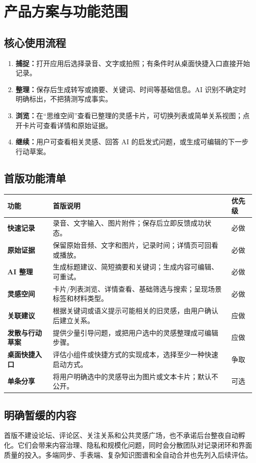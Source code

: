 \documentclass[UTF8,a4paper,12pt]{ctexart}
\begin{document}
\section{产品方案与功能范围}

\subsection{核心使用流程}
\begin{enumerate}
  \item \textbf{捕捉：}打开应用后选择录音、文字或拍照；有条件时从桌面快捷入口直接开始记录。
  \item \textbf{整理：}保存后生成转写或摘要、关键词、时间等基础信息。AI 识别不确定时明确标出，不把猜测写成事实。
  \item \textbf{浏览：}在“思维空间”查看已整理的灵感卡片，可切换列表或简单关系视图；点开卡片可查看详情和原始证据。
  \item \textbf{继续：}用户可查看相关灵感、回答 AI 的启发式问题，或生成可编辑的下一步行动草案。
\end{enumerate}

\subsection{首版功能清单}
\begin{tabularx}{\textwidth}{>{\bfseries}p{2.6cm} X p{2.6cm}}
\toprule
功能 & 首版说明 & 优先级\\
\midrule
快速记录 & 录音、文字输入、图片附件；保存后立即反馈成功状态。 & 必做\\
原始证据 & 保留原始音频、文字和图片，记录时间；详情页可回看或播放。 & 必做\\
AI 整理 & 生成标题建议、简短摘要和关键词；生成内容可编辑、可重试。 & 必做\\
灵感空间 & 卡片/列表浏览、详情查看、基础筛选与搜索；呈现场景标签和材料类型。 & 必做\\
关联建议 & 根据关键词或语义提示可能相关的旧灵感，由用户确认后建立关系。 & 应做\\
发散与行动草案 & 提供少量引导问题，或把用户选中的灵感整理成可编辑步骤。 & 应做\\
桌面快捷入口 & 评估小组件或快捷方式的实现成本，选择至少一种快速启动方式。 & 争取\\
单条分享 & 将用户明确选中的灵感导出为图片或文本卡片；默认不公开。 & 可选\\
\bottomrule
\end{tabularx}

\subsection{明确暂缓的内容}
首版不建设论坛、评论区、关注关系和公共灵感广场，也不承诺后台整夜自动孵化。它们会带来内容治理、隐私和规模化问题，同时会分散团队对记录闭环和界面质量的投入。多端同步、手表端、复杂知识图谱和全自动合并也先列入后续评估。
\end{document}
